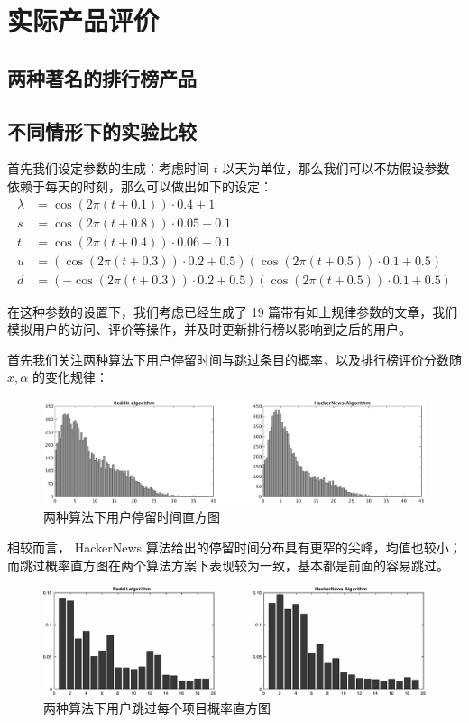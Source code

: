 \documentclass[UTF8]{ctexart}
\theoremstyle{plain}
\theoremstyle{definition}
\theoremstyle{remark}
\begin{document}
	\section{实际产品评价}
	\subsection{两种著名的排行榜产品}
	\subsection{不同情形下的实验比较}
	首先我们设定参数的生成：考虑时间 $t$ 以天为单位，那么我们可以不妨假设参数依赖于每天的时刻，那么可以做出如下的设定：
	\begin{align}
		\lambda &= \cos(2\pi(t+0.1)) \cdot 0.4 + 1 \\
		s &= \cos(2\pi(t+0.8)) \cdot 0.05 + 0.1 \\
		t &= \cos(2\pi(t+0.4))\cdot 0.06 + 0.1 \\
		u &= (\cos(2\pi(t+0.3)) \cdot 0.2 + 0.5)(\cos(2\pi(t+0.5))\cdot 0.1 + 0.5) \\
		d &= (-\cos(2\pi(t+0.3)) \cdot 0.2 + 0.5)(\cos(2\pi(t+0.5))\cdot 0.1 + 0.5)
	\end{align}
	
	在这种参数的设置下，我们考虑已经生成了 19 篇带有如上规律参数的文章，我们模拟用户的访问、评价等操作，并及时更新排行榜以影响到之后的用户。
	
	首先我们关注两种算法下用户停留时间与跳过条目的概率，以及排行榜评价分数随 $x, \alpha$ 的变化规律：
	
	\begin{figure}[h!] 
		\centering
		\includegraphics[width = \linewidth]{../model/douhu/pic/reddit-h-time.eps}
		\caption{两种算法下用户停留时间直方图}\label{fig:reddit-h-time}
	\end{figure}
	
	相较而言， HackerNews 算法给出的停留时间分布具有更窄的尖峰，均值也较小；而跳过概率直方图在两个算法方案下表现较为一致，基本都是前面的容易跳过。
	
	\begin{figure}[h!] 
		\centering
		\includegraphics[width = \linewidth]{../model/douhu/pic/reddit-h-skip.eps}
		\caption{两种算法下用户跳过每个项目概率直方图}\label{fig:reddit-h-skip}
	\end{figure}
	
\end{document}
